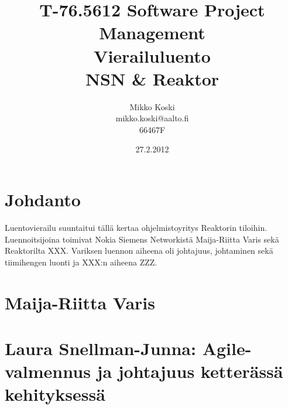 \documentclass[a4paper]{article}
\begin{document}
\title{\small T-76.5612 Software Project Management \\ Vierailuluento \\ \huge NSN & Reaktor}
\date{27.2.2012}
\author{Mikko Koski \\ mikko.koski@aalto.fi \\ 66467F}
\maketitle

\normalsize

\section{Johdanto}

Luentovierailu suuntaitui tällä kertaa ohjelmistoyritys Reaktorin tiloihin. Luennoitsijoina toimivat Nokia Siemens Networkistä Maija-Riitta Varis sekä Reaktorilta XXX. Variksen luennon aiheena oli johtajuus, johtaminen sekä tiimihengen luonti ja XXX:n aiheena ZZZ.

\section{Maija-Riitta Varis}


\section{Laura Snellman-Junna: Agile-valmennus ja johtajuus ketterässä kehityksessä}



\end{document}
